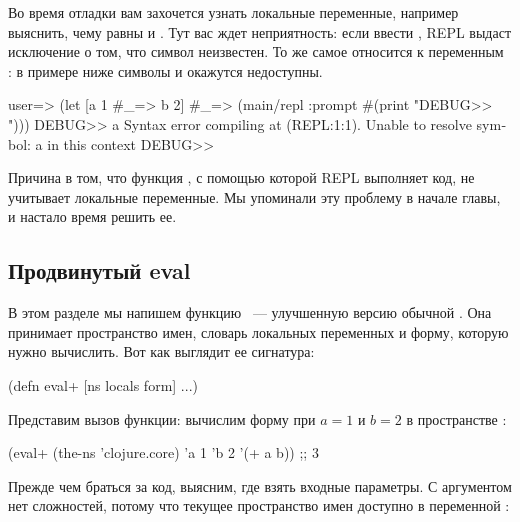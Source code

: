 Во время отладки вам захочется узнать локальные переменные, например выяснить, чему равны  и . Тут вас ждет неприятность: если ввести , REPL выдаст исключение о том, что символ неизвестен. То же самое относится к переменным : в примере ниже символы  и  окажутся недоступны.

\begin{english}
  \begin{text}
user=> (let [a 1
  #_=>       b 2]
  #_=>   (main/repl :prompt #(print "DEBUG>> ")))
DEBUG>> a
Syntax error compiling at (REPL:1:1).
Unable to resolve symbol: a in this context
DEBUG>>
  \end{text}
\end{english}

Причина в том, что функция , с помощью которой REPL выполняет код, не учитывает локальные переменные. Мы упоминали эту проблему в начале главы, и настало время решить ее.

\subsection{Продвинутый eval}


В этом разделе мы напишем функцию ~--- улучшенную версию обычной . Она принимает пространство имен, словарь локальных переменных и форму, которую нужно вычислить. Вот как выглядит ее сигнатура:

\begin{english}
  \begin{clojure}
(defn eval+ [ns locals form]
  ...)
  \end{clojure}
\end{english}

Представим вызов функции: вычислим форму  при $a = 1$ и $b = 2$ в пространстве :

\begin{english}
  \begin{clojure}
(eval+ (the-ns 'clojure.core)
       {'a 1 'b 2}
       '(+ a b))
;; 3
  \end{clojure}
\end{english}

Прежде чем браться за код, выясним, где взять входные параметры. С аргументом  нет сложностей, потому что текущее пространство имен доступно в переменной :

